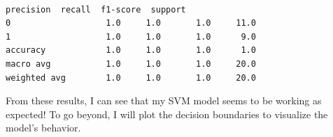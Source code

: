 \documentclass[11pt]{article}
\begin{document}
    \begin{center}
    \end{center}
    { \hspace*{\fill} \\}
    
    
    \begin{Verbatim}[commandchars=\\\{\}]
              precision  recall  f1-score  support
0                   1.0     1.0       1.0     11.0
1                   1.0     1.0       1.0      9.0
accuracy            1.0     1.0       1.0      1.0
macro avg           1.0     1.0       1.0     20.0
weighted avg        1.0     1.0       1.0     20.0
    \end{Verbatim}

    
    From these results, I can see that my SVM model seems to be working as
expected! To go beyond, I will plot the decision boundaries to visualize
the model's behavior.
\end{document}

